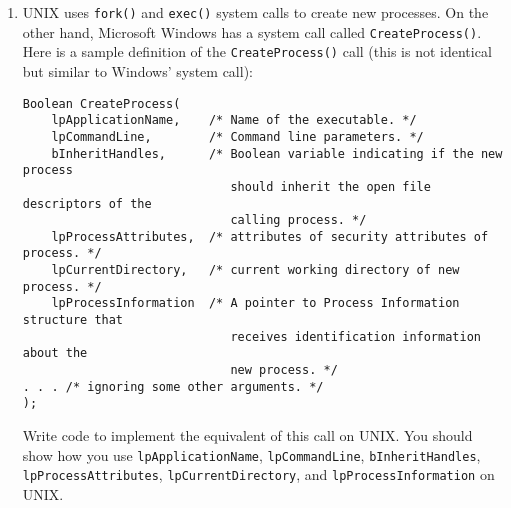 \begin{enumerate}
\item
UNIX uses {\tt fork()} and {\tt exec()} system calls to create new processes. On the other hand, Microsoft
Windows has a system call called {\tt CreateProcess()}.
Here is a sample definition of the
{\tt CreateProcess()} call
(this is not identical but similar to Windows’ system call):
\begin{verbatim}
Boolean CreateProcess(
    lpApplicationName,    /* Name of the executable. */
    lpCommandLine,        /* Command line parameters. */
    bInheritHandles,      /* Boolean variable indicating if the new process
                             should inherit the open file descriptors of the
                             calling process. */
    lpProcessAttributes,  /* attributes of security attributes of process. */
    lpCurrentDirectory,   /* current working directory of new process. */
    lpProcessInformation  /* A pointer to Process Information structure that
                             receives identification information about the
                             new process. */
. . . /* ignoring some other arguments. */
);
\end{verbatim}
Write code to implement the equivalent of this call on UNIX. You should show how you use
{\tt lpApplicationName}, {\tt lpCommandLine}, {\tt bInheritHandles},
{\tt lpProcessAttributes}, {\tt lpCurrentDirectory}, and {\tt lpProcessInformation}
on
UNIX.


\end{enumerate}

